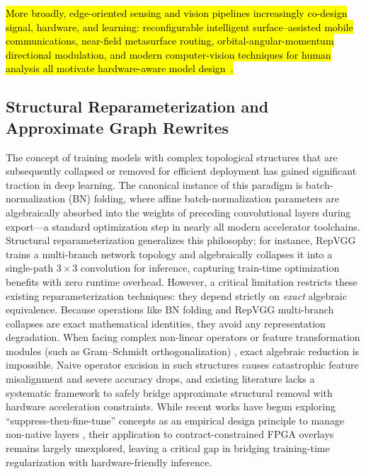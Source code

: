 \documentclass[algorithms,article,submit,moreauthors]{Definitions/mdpi}
\newcommand{\rev}[1]{\hl{#1}}
\begin{document}
\rev{More broadly, edge-oriented sensing and vision pipelines increasingly co-design signal, hardware, and learning: reconfigurable intelligent surface–assisted mobile communications, near-field metasurface routing, orbital-angular-momentum directional modulation, and modern computer-vision techniques for human analysis all motivate hardware-aware model design~\citep{bib_r3a,bib_r3b,bib_r3c,bib_r3d}.}

\subsection{Structural Reparameterization and Approximate Graph Rewrites}

The concept of training models with complex topological structures that are subsequently collapsed or removed for efficient deployment has gained significant traction in deep learning. The canonical instance of this paradigm is batch-normalization (BN) folding, where affine batch-normalization parameters are algebraically absorbed into the weights of preceding convolutional layers during export—a standard optimization step in nearly all modern accelerator toolchains. Structural reparameterization generalizes this philosophy; for instance, RepVGG \citep{bib16} trains a multi-branch network topology and algebraically collapses it into a single-path $3{\times}3$ convolution for inference, capturing train-time optimization benefits with zero runtime overhead. However, a critical limitation restricts these existing reparameterization techniques: they depend strictly on \emph{exact} algebraic equivalence. Because operations like BN folding and RepVGG multi-branch collapses are exact mathematical identities, they avoid any representation degradation. When facing complex non-linear operators or feature transformation modules (such as Gram--Schmidt orthogonalization) \citep{bibsoftortho}, exact algebraic reduction is impossible. Naive operator excision in such structures causes catastrophic feature misalignment and severe accuracy drops, and existing literature lacks a systematic framework to safely bridge approximate structural removal with hardware acceleration constraints. While recent works have begun exploring ``suppress-then-fine-tune'' concepts as an empirical design principle to manage non-native layers \citep{bib17}, their application to contract-constrained FPGA overlays remains largely unexplored, leaving a critical gap in bridging training-time regularization with hardware-friendly inference.
\end{document}
